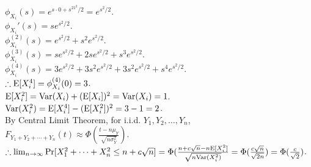 \begin{pr}
$\phi_{X_i}(s)=e^{s\cdot0+s^21^2/2}=e^{s^2/2}$.\\
$\phi_{X_i}'(s)=se^{s^2/2}$.\\
$\phi_{X_i}^{(2)}(s)=e^{s^2/2}+s^2e^{s^2/2}$.\\
$\phi_{X_i}^{(3)}(s)=se^{s^2/2}+2se^{s^2/2}+s^3e^{s^2/2}$.\\
$\phi_{X_i}^{(4)}(s)=3e^{s^2/2}+3s^2e^{s^2/2}+3s^2e^{s^2/2}+s^4e^{s^2/2}$.\\
$\therefore\mathrm{E}[X_i^4]=\phi_{X_i}^{(4)}(0)=3$.\\
$\mathrm{E}[X_i^2]=\mathrm{Var}(X_i)+(\mathrm{E}[X_i])^2=\mathrm{Var}(X_i)=1$.\\
$\mathrm{Var}(X_i^2)=\mathrm{E}[X_i^4]-(\mathrm{E}[X_i^2])^2=3-1=2$.\\
By Central Limit Theorem, for i.i.d. $Y_1, Y_2, \dots, Y_n$, $F_{Y_1+Y_2+\cdots+Y_n}(t)\approx\Phi(\frac{t-n\mu_Y}{\sqrt{n\sigma_Y^2}})$.\\
$\therefore\lim_{n\to\infty}\mathrm{Pr}[X_1^2+\cdots+X_n^2\leq n+c\sqrt n]=\Phi(\frac{n+c\sqrt n-n\mathrm{E}[X_i^2]}{\sqrt{n\mathrm{Var}(X_i^2)}}=\Phi(\frac{c\sqrt n}{\sqrt{2n}})=\Phi(\frac c{\sqrt2})$.
\end{pr}
